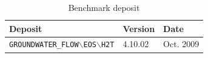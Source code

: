 \begin{table}[h]
\caption{Benchmark deposit}
\begin{center}
\begin{tabular}{lll}
\toprule
Deposit & Version & Date \\
\midrule
\texttt{GROUNDWATER\_FLOW$\backslash$EOS$\backslash$H2T}& 4.10.02 & Oct. 2009 \\
\bottomrule
\end{tabular}
\end{center}
\end{table}
